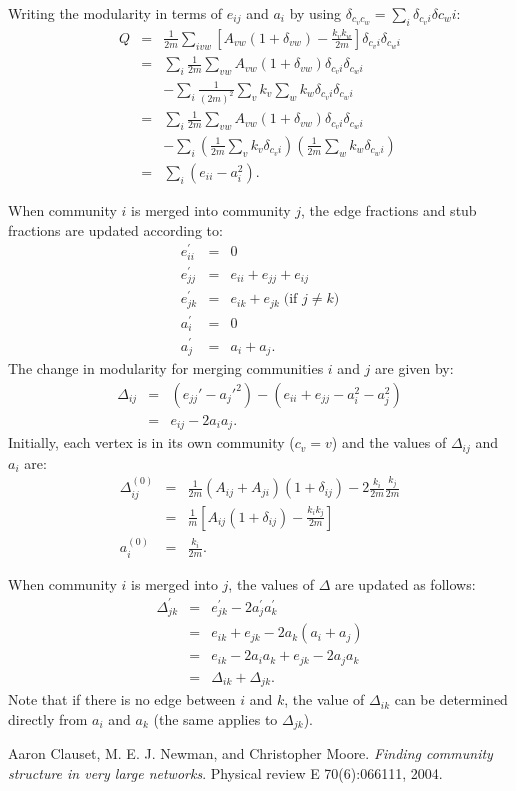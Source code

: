 \documentclass{article}
\newcommand{\beq}{\begin{eqnarray}}
\newcommand{\eeq}{\end{eqnarray}}
\begin{document}
Writing the modularity in terms of $e_{ij}$ and $a_i$ by using
$\delta_{c_vc_w} = \sum_i \delta_{c_vi}\delta{c_wi}$:
\beq
Q &=& \frac{1}{2m} \sum_{ivw} \left[ A_{vw} (1 + \delta_{vw}) - \frac{k_v k_w}{2m} \right]\delta_{c_v i}\delta_{c_w i} \\
&=& \sum_i 
\frac{1}{2m} \sum_{vw} A_{vw} (1 + \delta_{vw}) \delta_{c_v i}\delta_{c_w i}  \nonumber \\
&& - \sum_i  \frac{1}{(2m)^2} \sum_{v} k_v \sum_w k_w \delta_{c_v i}\delta_{c_w i}  \\
&=& \sum_i 
\frac{1}{2m} \sum_{vw} A_{vw} (1 + \delta_{vw}) \delta_{c_v i}\delta_{c_w i}  \nonumber \\
&& - \sum_i  \left( \frac{1}{2m} \sum_{v} k_v \delta_{c_v i} \right) \left(\frac{1}{2m}\sum_w k_w \delta_{c_w i} \right) \\
&=& \sum_i \left( e_{ii} - a_i^2 \right).
\eeq

When community $i$ is merged into community $j$, the edge fractions and stub
fractions are updated according to:
\beq
e_{ii}^\prime &=& 0 \\
e_{jj}^\prime &=& e_{ii} + e_{jj} + e_{ij} \\
e_{jk}^\prime &=& e_{ik} + e_{jk} \; \text{(if $j \neq k$)}\\
a_i^\prime &=& 0 \\
a_j^\prime &=& a_i + a_j.
\eeq
The change in modularity for merging communities $i$ and $j$ are given by:
\beq
\Delta_{ij} &=& \left( e_{jj}' - a_j'^2 \right)
- \left(e_{ii} + e_{jj} - a_i^2 - a_j^2 \right) \\
&=&
e_{ij} - 2 a_i a_j.
\eeq
Initially, each vertex is in its own community ($c_v = v$)
and the values of $\Delta_{ij}$ and $a_i$ are:
\beq
\Delta^{(0)}_{ij} &=&
\frac{1}{2m}(A_{ij} + A_{ji})(1 + \delta_{ij})
- 2\frac{k_i}{2m}\frac{k_j}{2m} \\
 &=& \frac{1}{m}\left[ A_{ij}(1+\delta_{ij}) - \frac{k_ik_j}{2m}\right] \\
 a_i^{(0)} &=& \frac{k_i}{2m}.
\eeq

When community $i$ is merged into $j$, the values of $\Delta$ are updated
as follows:
\beq
\Delta^\prime_{jk} &=& e_{jk}^\prime - 2 a_j^\prime a_k^\prime \\
&=& e_{ik} + e_{jk} - 2 a_k ( a_i + a_j) \\
&=& e_{ik} - 2 a_i a_k + e_{jk} - 2 a_j a_k \\
&=& \Delta_{ik} + \Delta_{jk}.
\eeq
Note that if there is no edge between $i$ and $k$,
the value of $\Delta_{ik}$ can be determined directly from $a_i$ and $a_k$
(the same applies to $\Delta_{jk}$).

\begin{thebibliography}{1}
Aaron Clauset, M. E. J. Newman, and Christopher Moore.
\textit{Finding community structure in very large networks}. 
Physical review E 70(6):066111, 2004.
\end{thebibliography}
\end{document}
